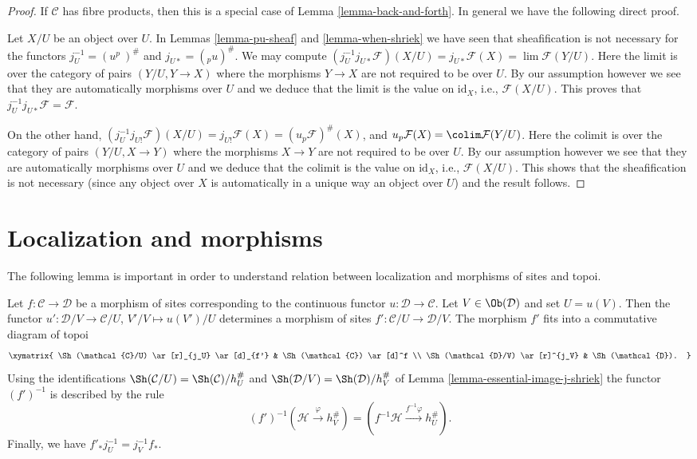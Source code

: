 \begin{proof}
If $\mathcal{C}$ has fibre products, then this is a special case of
Lemma \ref{lemma-back-and-forth}. In general we have the following
direct proof.

\medskip\noindent
Let $X/U$ be an object over $U$.
In Lemmas \ref{lemma-pu-sheaf} and \ref{lemma-when-shriek} we have seen that
sheafification is not necessary for the functors
$j_U^{-1} = (u^p\ )^\#$ and $j_{U*} = ({}_pu )^\#$.
We may compute
$(j_U^{-1}j_{U*}\mathcal{F})(X/U) = j_{U*}\mathcal{F}(X)
= \lim \mathcal{F}(Y/U)$. Here the limit
is over the category of pairs $(Y/U, Y \to X)$
where the morphisms $Y \to X$ are not required to be over $U$.
By our assumption however we see that they are automatically
morphisms over $U$ and we deduce that the limit is the
value on $\text{id}_X$, i.e., $\mathcal{F}(X/U)$.
This proves that $j_U^{-1}j_{U*}\mathcal{F} = \mathcal{F}$.

\medskip\noindent
On the other hand,
$(j_U^{-1}j_{U!}\mathcal{F})(X/U) =
j_{U!}\mathcal{F}(X) = (u_p\mathcal{F})^\#(X)$, and
$u_p\mathcal{F}(X) = \colim \mathcal{F}(Y/U)$.
Here the colimit is over the category of pairs $(Y/U, X \to Y)$
where the morphisms $X \to Y$ are not required to be over $U$.
By our assumption however we see that they are automatically
morphisms over $U$ and we deduce that the colimit is the
value on $\text{id}_X$, i.e., $\mathcal{F}(X/U)$.
This shows that the sheafification is not necessary (since any
object over $X$ is automatically in a unique way an object over $U$)
and the result follows.
\end{proof}








\section{Localization and morphisms}
\label{section-localize-morphisms}

\noindent
The following lemma is important in order to understand relation
between localization and morphisms of sites and topoi.

\begin{lemma}
\label{lemma-localize-morphism}
Let $f : \mathcal{C} \to \mathcal{D}$ be a morphism of sites
corresponding to the continuous functor $u : \mathcal{D} \to \mathcal{C}$.
Let $V \in \Ob(\mathcal{D})$ and set $U = u(V)$.
Then the functor $u' : \mathcal{D}/V \to \mathcal{C}/U$,
$V'/V \mapsto u(V')/U$ determines a morphism of sites
$f' : \mathcal{C}/U \to \mathcal{D}/V$.
The morphism $f'$ fits into a commutative diagram of topoi
$$
\xymatrix{
\Sh(\mathcal{C}/U) \ar[r]_{j_U} \ar[d]_{f'} &
\Sh(\mathcal{C}) \ar[d]^f \\
\Sh(\mathcal{D}/V) \ar[r]^{j_V} &
\Sh(\mathcal{D}).
}
$$
Using the identifications
$\Sh(\mathcal{C}/U) = \Sh(\mathcal{C})/h_U^\#$ and
$\Sh(\mathcal{D}/V) = \Sh(\mathcal{D})/h_V^\#$ of
Lemma \ref{lemma-essential-image-j-shriek}
the functor $(f')^{-1}$ is described by the rule
$$
(f')^{-1}(\mathcal{H} \xrightarrow{\varphi} h_V^\#)
=
(f^{-1}\mathcal{H} \xrightarrow{f^{-1}\varphi} h_U^\#).
$$
Finally, we have $f'_*j_U^{-1} = j_V^{-1}f_*$.
\end{lemma}

